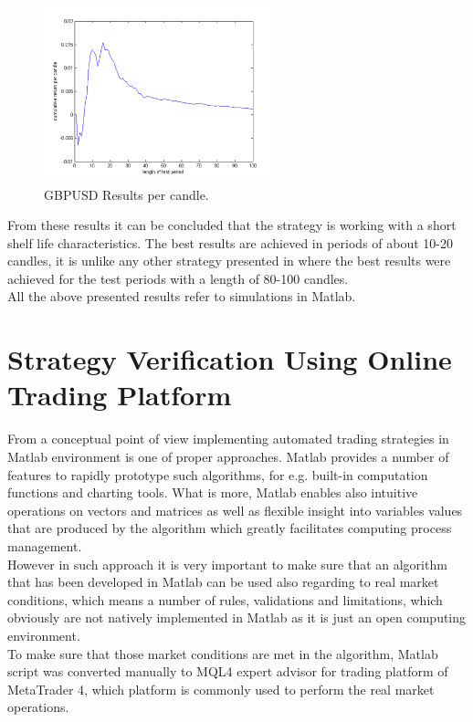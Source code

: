 \documentclass[runningheads,a4paper]{llncs}
\begin{document}
\begin{figure}[h!]
\centering
\includegraphics[width = 0.6\textwidth]{figures/rys11.png}
\caption{GBPUSD Results per candle.}
\label{fig:fig11}
\end{figure}
\FloatBarrier

From these results it can be concluded that the strategy is working with a short shelf life characteristics. The best results are achieved in periods of about 10-20 candles, it is unlike any other strategy presented in \cite{Wilinski2014} where the best results were achieved for the test periods with a length of 80-100 candles.\\
All the above presented results refer to simulations in Matlab.

\section{Strategy Verification Using Online Trading Platform}
From a conceptual point of view implementing automated trading strategies in Matlab environment is one of proper approaches. Matlab provides a number of features to rapidly prototype such algorithms, for e.g. built-in computation functions and charting tools. What is more, Matlab enables also intuitive operations on vectors and matrices as well as flexible insight into variables values that are produced by the algorithm which greatly facilitates computing process management.\\

However in such approach it is very important to make sure that an algorithm that has been developed in Matlab can be used also regarding to real market conditions, which means a number of rules, validations and limitations, which obviously are not natively implemented in Matlab as it is just an open computing environment.\\

To make sure that those market conditions are met in the algorithm, Matlab script was converted manually to MQL4 expert advisor for trading platform of MetaTrader 4, which platform is commonly used to perform the real market operations.\\
\end{document}
